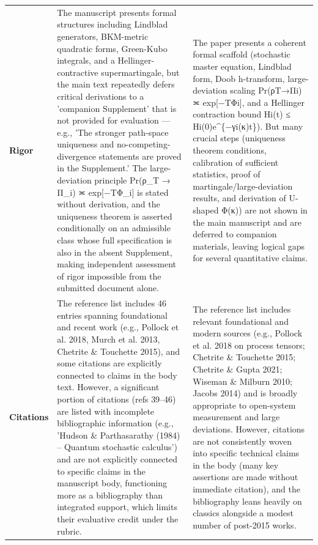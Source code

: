 \documentclass[11pt]{article}
\begin{document}
\begin{longtable}{@{} p{2.2cm} p{6.3cm} p{6.3cm} @{}}
\rowcolor{rowgray}
\textbf{Rigor} &
The manuscript presents formal structures including Lindblad generators, BKM-metric quadratic forms, Green-Kubo integrals, and a Hellinger-contractive supermartingale, but the main text repeatedly defers critical derivations to a 'companion Supplement' that is not provided for evaluation — e.g., 'The stronger path-space uniqueness and no-competing-divergence statements are proved in the Supplement.' The large-deviation principle Pr(ρ\_T → Π\_i) ≍ exp[−TΦ\_i] is stated without derivation, and the uniqueness theorem is asserted conditionally on an admissible class whose full specification is also in the absent Supplement, making independent assessment of rigor impossible from the submitted document alone. &
The paper presents a coherent formal scaffold (stochastic master equation, Lindblad form, Doob h-transform, large-deviation scaling Pr(ρT→Πi) ≍ exp[−TΦi], and a Hellinger contraction bound Hi(t) ≤ Hi(0)e\textasciicircum{}\{−γi(κ)t\}). But many crucial steps (uniqueness theorem conditions, calibration of sufficient statistics, proof of martingale/large-deviation results, and derivation of U-shaped Φ(κ)) are not shown in the main manuscript and are deferred to companion materials, leaving logical gaps for several quantitative claims. \\[6pt]

\textbf{Citations} &
The reference list includes 46 entries spanning foundational and recent work (e.g., Pollock et al. 2018, Murch et al. 2013, Chetrite \& Touchette 2015), and some citations are explicitly connected to claims in the body text. However, a significant portion of citations (refs 39–46) are listed with incomplete bibliographic information (e.g., 'Hudson \& Parthasarathy (1984) – Quantum stochastic calculus') and are not explicitly connected to specific claims in the manuscript body, functioning more as a bibliography than integrated support, which limits their evaluative credit under the rubric. &
The reference list includes relevant foundational and modern sources (e.g., Pollock et al. 2018 on process tensors; Chetrite \& Touchette 2015; Chetrite \& Gupta 2021; Wiseman \& Milburn 2010; Jacobs 2014) and is broadly appropriate to open-system measurement and large deviations. However, citations are not consistently woven into specific technical claims in the body (many key assertions are made without immediate citation), and the bibliography leans heavily on classics alongside a modest number of post-2015 works. \\

\end{longtable}
\end{document}
